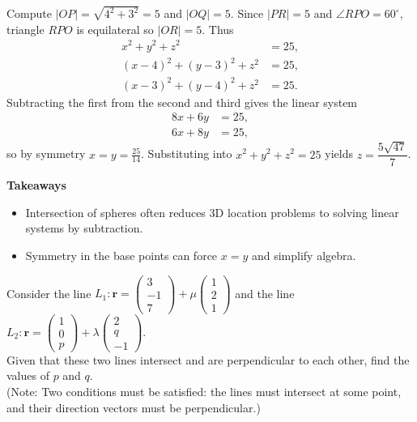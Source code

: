 \begin{solution}[Sketch]
Compute $|OP|=\sqrt{4^2+3^2}=5$ and $|OQ|=5$. Since $|PR|=5$ and $\angle RPO=60^\circ$, triangle $RPO$ is equilateral so $|OR|=5$. Thus
\begin{align*}
x^2+y^2+z^2 &= 25, \\
(x-4)^2+(y-3)^2+z^2 &= 25, \\
(x-3)^2+(y-4)^2+z^2 &= 25.
\end{align*}
Subtracting the first from the second and third gives the linear system
\begin{align*}
8x+6y &= 25, \\
6x+8y &= 25,
\end{align*}
so by symmetry $x=y=\tfrac{25}{14}$. Substituting into $x^2+y^2+z^2=25$ yields $z=\dfrac{5\sqrt{47}}{7}$.
\end{solution}

\vspace{0.5em}
\noindent\textbf{Takeaways}
\begin{itemize}
    \item Intersection of spheres often reduces 3D location problems to solving linear systems by subtraction.
    \item Symmetry in the base points can force $x=y$ and simplify algebra.
\end{itemize}

\begin{problem}
Consider the line $L_1: \mathbf{r} = \begin{pmatrix} 3 \\ -1 \\ 7 \end{pmatrix} + \mu \begin{pmatrix} 1 \\ 2 \\ 1 \end{pmatrix}$ and the line $L_2: \mathbf{r} = \begin{pmatrix} 1 \\ 0 \\ p \end{pmatrix} + \lambda \begin{pmatrix} 2 \\ q \\ -1 \end{pmatrix}$. \\
Given that these two lines intersect and are perpendicular to each other, find the values of $p$ and $q$. \\
(Note: Two conditions must be satisfied: the lines must intersect at some point, and their direction vectors must be perpendicular.)
\end{problem}

